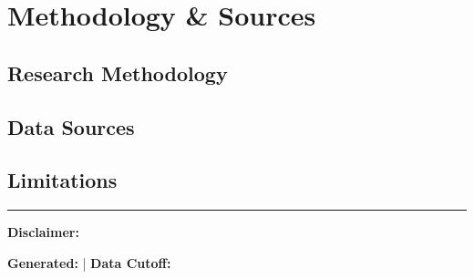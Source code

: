 \documentclass[11pt,a4paper]{article}
\begin{document}

\section{Methodology \& Sources}

\subsection{Research Methodology}

\subsection{Data Sources}

\subsection{Limitations}

\vfill
\hrule
\vspace{10pt}
{\scriptsize\color{msgray}
\textbf{Disclaimer:} 

\textbf{Generated:}  | \textbf{Data Cutoff:} 
}
\end{document}

